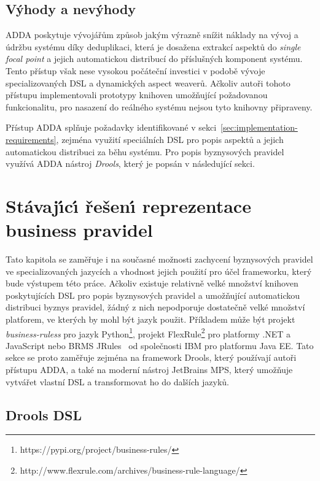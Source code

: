 \subsection{Výhody a nevýhody}

\gls{ADDA} poskytuje vývojářům způsob jakým výrazně snížit náklady na vývoj a údržbu
systému díky deduplikaci, která je dosažena extrakcí aspektů
do \textit{single focal point} a jejich automatickou distribucí do
příslušných komponent systému. Tento přístup však nese vysokou počáteční investici v
podobě vývoje specializovaných \gls{DSL} a dynamických aspect weaverů.
Ačkoliv autoři tohoto přístupu implementovali prototypy knihoven umožňující
požadovanou funkcionalitu, pro nasazení do reálného systému
nejsou tyto knihovny připraveny.

Přístup \gls{ADDA} splňuje požadavky identifikované v sekci~\ref{sec:implementation-requirements},
zejména využití speciálních \gls{DSL} pro popis aspektů a
jejich automatickou distribuci za běhu systému. Pro popis byznysových pravidel
využívá \gls{ADDA} nástroj \textit{Drools}, který je popsán v následující sekci.

\section{Stávaj\'{\i}c\'{\i} řešen\'{\i} reprezentace business pravidel}\label{sec:business-rule-dsl}

Tato kapitola se zaměřuje i na současné možnosti zachycení
byznysových pravidel ve specializovaných jazycích a vhodnost jejich použití
pro účel frameworku, který bude výstupem této práce.
Ačkoliv existuje relativně velké množství knihoven poskytujících
\gls{DSL} pro popis byznysových pravidel a umožňující automatickou
distribuci byznys pravidel, žádný z nich nepodporuje dostatečně velké množství
platforem, ve kterých by mohl být jazyk použit. Příkladem může být projekt \textit{business-ruless}
pro jazyk Python\footnote{https://pypi.org/project/business-rules/}, projekt
FlexRule\footnote{http://www.flexrule.com/archives/business-rule-language/} pro platformy .NET a
JavaScript nebo \gls{BRMS} JRules~\cite{boyer2011ibm} od společnosti \gls{IBM} pro platformu \gls{Java EE}.
Tato sekce se proto zaměřuje zejména na framework Drools, který používají autoři přístupu \gls{ADDA},
a také na moderní nástroj JetBrains MPS, který umožňuje vytvářet vlastní \gls{DSL} a transformovat
ho do dalších jazyků.

\subsection{Drools DSL}


